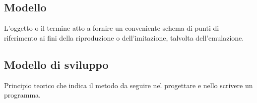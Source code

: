 \documentclass[../glossario.tex]{subfiles}
\begin{document}
\subsection*{Modello}
{}
L'oggetto o il termine atto a fornire un conveniente schema di punti di riferimento ai fini della riproduzione o dell'imitazione, talvolta dell'emulazione.

\subsection*{Modello di sviluppo}
{}
Principio teorico che indica il metodo da seguire nel progettare e nello scrivere un programma.
\end{document}
